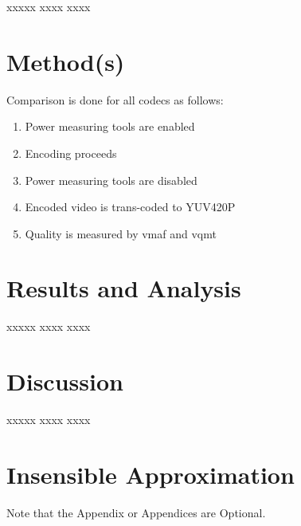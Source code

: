 \documentclass[12pt,twoside]{article}
\begin{document}
xxxxx xxxx xxxx 


\section{Method(s)}
\label{sec:method}
Comparison is done for all codecs as follows:
\begin{enumerate}
	\item Power measuring tools are enabled
	\item Encoding proceeds
	\item Power measuring tools are disabled
	\item Encoded video is trans-coded to YUV420P
	\item Quality is measured by \acrshort{vmaf} and \acrshort{vqmt}
\end{enumerate}
\section{Results and Analysis}
\label{sec:results}

xxxxx xxxx xxxx 

\section{Discussion}
\label{sec:discussion}
xxxxx xxxx xxxx 

\printbibliography
\appendix
\section{Insensible Approximation}

Note that the Appendix or Appendices are Optional.
\end{document}
